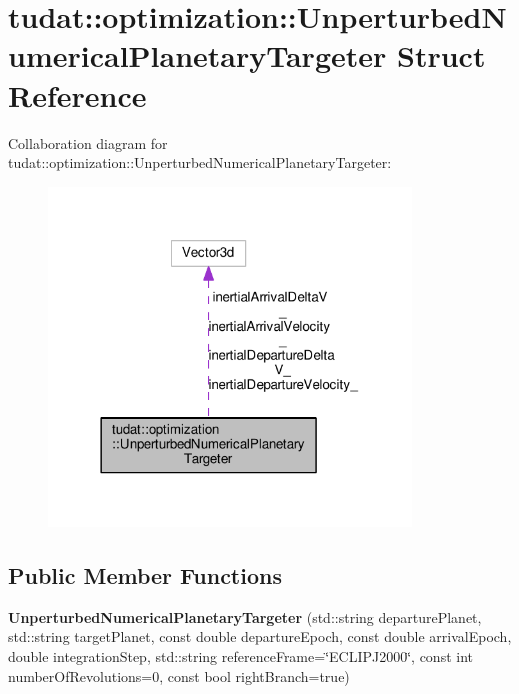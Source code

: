 \hypertarget{structtudat_1_1optimization_1_1UnperturbedNumericalPlanetaryTargeter}{}\section{tudat\+:\+:optimization\+:\+:Unperturbed\+Numerical\+Planetary\+Targeter Struct Reference}
\label{structtudat_1_1optimization_1_1UnperturbedNumericalPlanetaryTargeter}


Collaboration diagram for tudat\+:\+:optimization\+:\+:Unperturbed\+Numerical\+Planetary\+Targeter\+:
\nopagebreak
\begin{figure}[H]
\begin{center}
\leavevmode
\includegraphics[width=273pt]{structtudat_1_1optimization_1_1UnperturbedNumericalPlanetaryTargeter__coll__graph}
\end{center}
\end{figure}
\subsection*{Public Member Functions}
\begin{DoxyCompactItemize}
\item 
{\bfseries Unperturbed\+Numerical\+Planetary\+Targeter} (std\+::string departure\+Planet, std\+::string target\+Planet, const double departure\+Epoch, const double arrival\+Epoch, double integration\+Step, std\+::string reference\+Frame=\char`\"{}E\+C\+L\+I\+P\+J2000\char`\"{}, const int number\+Of\+Revolutions=0, const bool right\+Branch=true)\hypertarget{structtudat_1_1optimization_1_1UnperturbedNumericalPlanetaryTargeter_ac7020c4d92e9b7bd0c37f63dfd774ed4}{}\label{structtudat_1_1optimization_1_1UnperturbedNumericalPlanetaryTargeter_ac7020c4d92e9b7bd0c37f63dfd774ed4}

\end{DoxyCompactItemize}
